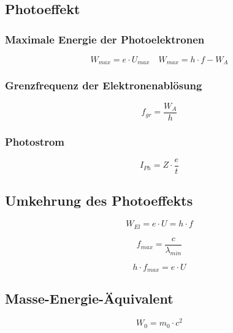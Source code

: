 
\subsection{Photoeffekt}

\subsubsection{Maximale Energie der Photoelektronen}
\begin{equation}\label{eq:photoeffekt:maximale:energie:elektron}
W_{max} = e \cdot U_{max} \quad W_{max} = h \cdot f - W_A
\end{equation}

\subsubsection{Grenzfrequenz der Elektronenablösung}
\begin{equation}\label{eq:photoeffekt:grenzfrequenz}
f_{gr} = \frac{W_A}{h}
\end{equation}

\subsubsection{Photostrom}
\begin{equation}\label{eq:photoeffekt:photostrom}
I_{Ph} = Z \cdot \frac{e}{t}
\end{equation}

\subsection{Umkehrung des Photoeffekts}
\begin{equation}\label{eq:umgekehrter:photoeffekt:energie}
W_{El} = e \cdot U = h \cdot f
\end{equation}

\begin{equation}\label{eq:umgekehrter:photoeffekt:maximale:frequenz}
f_{max} = \frac{c}{\lambda_{min}}
\end{equation}

\begin{equation}\label{eq:umgekehrter:photoeffekt:energiebilanz}
h \cdot f_{max} = e \cdot U
\end{equation}

\subsection{Masse-Energie-Äquivalent}
\begin{equation}\label{eq:masse:energie:aequivalent}
W_0 = m_0 \cdot c^2
\end{equation}

